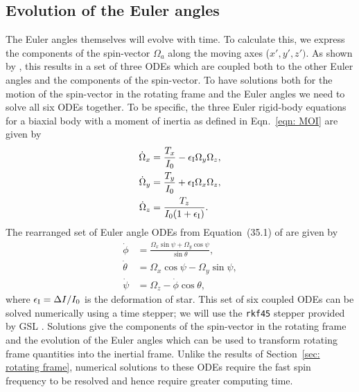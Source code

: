 \documentclass[../full_thesis/full_thesis.tex]{subfiles}
\begin{document}
\subsection{Evolution of the Euler angles}
\label{sec: evolution of the euler angles}
The Euler angles themselves will evolve with time. To calculate this, we
express the components of the spin-vector $\Omega_a$ along the moving axes ($x', y', z')$. As
shown by \citeauthor{Landau1969}, this results in a set of three ODEs which are
coupled both to the other Euler angles and the components of the spin-vector.
To have solutions both for the motion of the spin-vector in the rotating frame
and the Euler angles we need to solve all six ODEs together. To be specific,
the three Euler rigid-body equations for a biaxial body with a moment
of inertia as defined in Eqn.~\eqref{eqn: MOI} are given by
\begin{align}
\dot{\Omega}_{x} & = \frac{T_x}{I_{0}} -\epsilon_{\mathrm{I}} \Omega_{y} \Omega_{z},
\label{eqn: 6ODE x}
\\
\dot{\Omega}_{y} & = \frac{T_y}{I_{0}} + \epsilon_{\mathrm{I}} \Omega_{x} \Omega_{z},
\label{eqn: 6ODE y}
\\
\dot{\Omega}_{z} & =\frac{T_z}{I_{0}(1+\epsilon_{\mathrm{I}})}.
\label{eqn: 6ODE z}
\end{align}
The rearranged set of Euler angle ODEs from Equation~(35.1) of
\citet{Landau1969} are given by
\begin{align}
\dot{\phi} & = \frac{\Omega_{x} \sin \psi + \Omega_{y} \cos \psi}{\sin \theta},
\label{eqn: 6ODE phi}
\\
\dot{\theta} & = \Omega_{x} \cos \psi - \Omega_{y} \sin \psi,
\label{eqn: 6ODE theta}
\\
\dot{\psi} & = \Omega_{z} - \dot{\phi} \cos \theta,
\label{eqn: 6ODE psi}
\end{align}
where $\epsilon_{\mathrm{I}} = \Delta I/I_0$ is the deformation of star.
This set of six coupled ODEs can be solved numerically using a time stepper; we
will use the \texttt{rkf45} stepper provided by GSL \citep{gough2009gnu}.
Solutions give the components of the spin-vector in the rotating frame and the
evolution of the Euler angles which can be used to transform rotating frame
quantities into the inertial frame. Unlike the results of Section~\ref{sec:
rotating frame}, numerical solutions to these ODEs require the fast spin frequency
to be resolved and hence require greater computing time.

\end{document}
